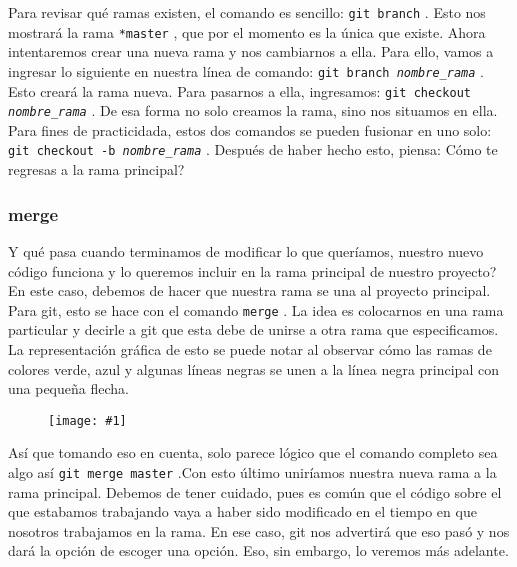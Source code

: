 \documentclass[10pt,letterpaper]{article}
\newcommand{\inlinecode}[1]{
\colorbox{light-gray}{\texttt{#1}}
}
\newcommand{\Picture}[1]
{
	\begin{figure}[H]
	\begin{flushleft}
	\texttt{[image: \#1]}
	\end{flushleft}
	\end{figure}
}
\begin{document}
Para revisar qu\'e ramas existen, el comando es sencillo: \inlinecode{git branch}. Esto nos mostrar\'a la rama \inlinecode{*master}, que por el momento es la \'unica que existe. Ahora intentaremos crear una nueva rama y nos cambiarnos a ella. Para ello, vamos a ingresar lo siguiente en nuestra l\'inea de comando: \inlinecode{git branch \emph{nombre\_rama}}. Esto crear\'a la rama nueva. Para pasarnos a ella, ingresamos: \inlinecode{git checkout \emph{nombre\_rama}}. De esa forma no solo creamos la rama, sino nos situamos en ella. Para fines de practicidada, estos dos comandos se pueden fusionar en uno solo: \inlinecode{git checkout -b \emph{nombre\_rama}}. Despu\'es de haber hecho esto, piensa: C\'omo te regresas a la rama principal?

\subsubsection{merge}
Y qu\'e pasa cuando terminamos de modificar lo que quer\'iamos, nuestro nuevo c\'odigo funciona y lo queremos incluir en la rama principal de nuestro proyecto? En este caso, debemos de hacer que nuestra rama se una al proyecto principal. Para git, esto se hace con el comando \inlinecode{merge}. La idea es colocarnos en una rama particular y decirle a git que esta debe de unirse a otra rama que especificamos. La representaci\'on gr\'afica de esto se puede notar al observar c\'omo las ramas de colores verde, azul y algunas l\'ineas negras se unen a la l\'inea negra principal con una peque\~na flecha.\\

\Picture{img/merge.png}

As\'i que tomando eso en cuenta, solo parece l\'ogico que el comando completo sea algo as\'i \inlinecode{git merge master}.Con esto \'ultimo unir\'iamos nuestra nueva rama a la rama principal. Debemos de tener cuidado, pues es com\'un que el c\'odigo sobre el que estabamos trabajando vaya a haber sido modificado en el tiempo en que nosotros trabajamos en la rama. En ese caso, git nos advertir\'a que eso pas\'o y nos dar\'a la opci\'on de escoger una opci\'on. Eso, sin embargo, lo veremos m\'as adelante.
\end{document}
